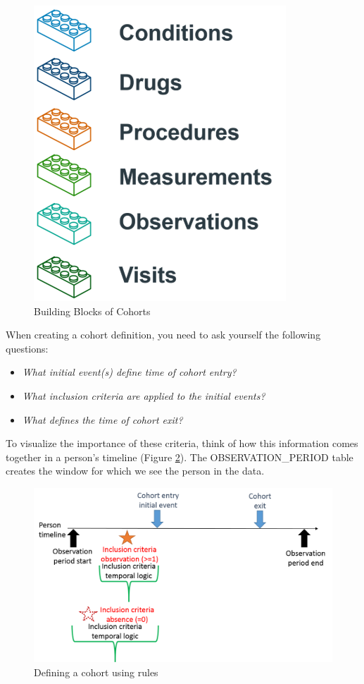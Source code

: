 \documentclass[11pt]{book}
\providecommand{\tightlist}{%
  \setlength{\itemsep}{0pt}\setlength{\parskip}{0pt}}
\theoremstyle{definition}
\theoremstyle{definition}
\theoremstyle{definition}
\theoremstyle{remark}
\begin{document}
\begin{figure}

{\centering \includegraphics[width=0.5\linewidth]{images/Cohorts/cohort-legos} 

}

\caption{Building Blocks of Cohorts}\label{fig:cohortLegos}
\end{figure}

When creating a cohort definition, you need to ask yourself the following questions:

\begin{itemize}
\tightlist
\item
  \emph{What initial event(s) define time of cohort entry?}
\item
  \emph{What inclusion criteria are applied to the initial events?}
\item
  \emph{What defines the time of cohort exit?}
\end{itemize}

To visualize the importance of these criteria, think of how this information comes together in a person's timeline (Figure \ref{fig:cohortBuild}). The OBSERVATION\_PERIOD table creates the window for which we see the person in the data.

\begin{figure}

{\centering \includegraphics[width=0.9\linewidth]{images/Cohorts/cohortbuild} 

}

\caption{Defining a cohort using rules}\label{fig:cohortBuild}
\end{figure}
\end{document}
